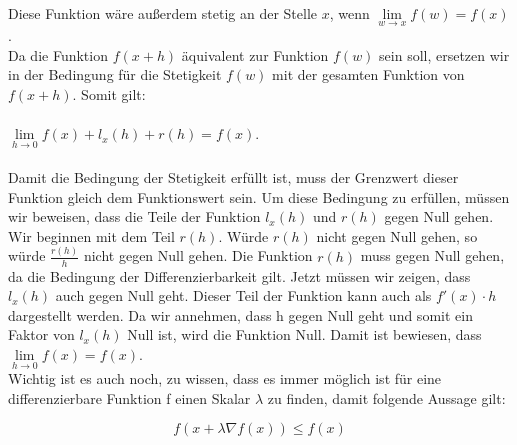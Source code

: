 Diese Funktion wäre außerdem stetig an der Stelle $x$, wenn $\lim\limits_{w \rightarrow x} f(w)=f(x)$.\\
Da die Funktion $f(x+h)$ äquivalent zur Funktion $f(w)$ sein soll, ersetzen wir in der Bedingung für die Stetigkeit $f(w)$ mit der gesamten Funktion von $f(x+h)$.  
Somit gilt: \\ \\
$\lim\limits_{h \rightarrow 0} f(x)+l_x(h)+r(h)=f(x)$. \\ \\

Damit die Bedingung der Stetigkeit erfüllt ist, muss der Grenzwert dieser Funktion gleich dem Funktionswert sein. Um diese Bedingung zu erfüllen, müssen wir beweisen, dass die Teile der Funktion $l_x(h)$ und $r(h)$ gegen Null gehen. Wir beginnen mit dem Teil $r(h)$.  Würde $r(h)$ nicht gegen Null gehen, so würde $\frac{r(h)}{h}$ nicht gegen Null gehen. Die Funktion $r(h)$ muss gegen Null gehen, da die Bedingung der Differenzierbarkeit gilt. Jetzt müssen wir zeigen, dass $l_x(h)$ auch gegen Null geht. Dieser Teil der Funktion kann auch als $f'(x) \cdot h$ dargestellt werden. Da wir annehmen, dass h gegen Null geht und somit ein Faktor von $l_x(h)$ Null ist, wird die Funktion Null. Damit ist bewiesen, dass $\lim\limits_{h \rightarrow 0} f(x)=f(x)$. \\

Wichtig ist es auch noch, zu wissen, dass es immer möglich ist für eine differenzierbare Funktion f einen Skalar $\lambda$ zu finden, damit folgende Aussage gilt: 

\begin{equation}f(x + \lambda \nabla f(x)) \leq f(x)\end{equation} 

